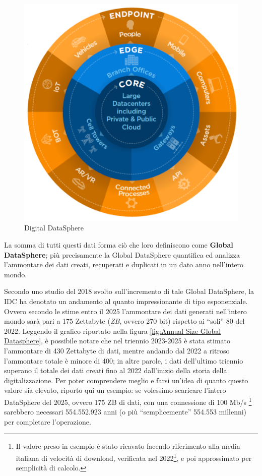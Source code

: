\begin{figure}[H]
    \centering
    \includegraphics[width=0.5\linewidth]{figure/capitolo_1/Digital-Datasphere.pdf}
    \caption{Digital DataSphere}
    \label{fig:Digital-Datasphere}
\end{figure}

La somma di tutti questi dati forma ciò che loro definiscono come \textbf{Global DataSphere}; più precisamente la Global DataSphere quantifica ed analizza l'ammontare dei dati creati, recuperati e duplicati in un dato anno nell'intero mondo.

Secondo uno studio del 2018 svolto sull'incremento di tale Global DataSphere, la IDC ha denotato un andamento al quanto impressionante di tipo esponenziale. Ovvero secondo le stime entro il 2025 l'ammontare dei dati generati nell'intero mondo sarà pari a 175 Zettabyte (\textit{ZB}, ovvero 270 bit) rispetto ai ``soli'' 80 del 2022. Leggendo il grafico riportato nella figura \ref{fig:Annual Size Global Datasphere}, è possibile notare che nel triennio 2023-2025 è stata stimato l'ammontare di 430 Zettabyte di dati, mentre andando dal 2022 a ritroso l'ammontare totale è minore di 400; in altre parole, i dati dell'ultimo triennio superano il totale dei dati creati fino al 2022 dall'inizio della storia della digitalizzazione. Per poter comprendere meglio e farsi un'idea di quanto questo valore sia elevato, riporto qui un esempio: se volessimo scaricare l'intero DataSphere del 2025, ovvero 175 ZB di dati, con una connessione di 100 Mb/s \footnote{Il valore preso in esempio è stato ricavato facendo riferimento alla media italiana di velocità di download, verificata nel 2022\footnote{\textit{URL Fonte}: https://tinyurl.com/394xpmre}, e poi approssimato per semplicità di calcolo.} sarebbero necessari 554.552.923 anni (o più ``semplicemente'' 554.553 millenni) per completare l'operazione.

